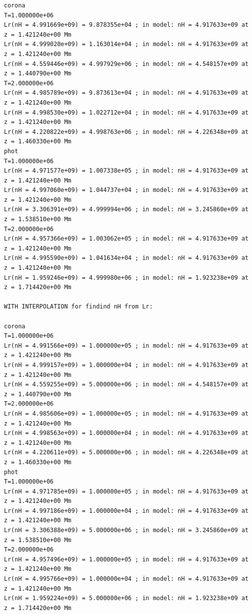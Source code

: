 \documentclass[10pt]{book}
\begin{document}
\begin{verbatim}
corona
T=1.000000e+06
Lr(nH = 4.991669e+09) = 9.878355e+04 ; in model: nH = 4.917633e+09 at z = 1.421240e+00 Mm
Lr(nH = 4.999020e+09) = 1.163014e+04 ; in model: nH = 4.917633e+09 at z = 1.421240e+00 Mm
Lr(nH = 4.559446e+09) = 4.997929e+06 ; in model: nH = 4.548157e+09 at z = 1.440790e+00 Mm
T=2.000000e+06
Lr(nH = 4.985789e+09) = 9.873613e+04 ; in model: nH = 4.917633e+09 at z = 1.421240e+00 Mm
Lr(nH = 4.998530e+09) = 1.022712e+04 ; in model: nH = 4.917633e+09 at z = 1.421240e+00 Mm
Lr(nH = 4.220822e+09) = 4.998763e+06 ; in model: nH = 4.226348e+09 at z = 1.460330e+00 Mm
phot
T=1.000000e+06
Lr(nH = 4.971577e+09) = 1.007338e+05 ; in model: nH = 4.917633e+09 at z = 1.421240e+00 Mm
Lr(nH = 4.997060e+09) = 1.044737e+04 ; in model: nH = 4.917633e+09 at z = 1.421240e+00 Mm
Lr(nH = 3.306391e+09) = 4.999994e+06 ; in model: nH = 3.245860e+09 at z = 1.538510e+00 Mm
T=2.000000e+06
Lr(nH = 4.957366e+09) = 1.003062e+05 ; in model: nH = 4.917633e+09 at z = 1.421240e+00 Mm
Lr(nH = 4.995590e+09) = 1.041634e+04 ; in model: nH = 4.917633e+09 at z = 1.421240e+00 Mm
Lr(nH = 1.959246e+09) = 4.999980e+06 ; in model: nH = 1.923238e+09 at z = 1.714420e+00 Mm

WITH INTERPOLATION for findind nH from Lr:

corona
T=1.000000e+06
Lr(nH = 4.991566e+09) = 1.000000e+05 ; in model: nH = 4.917633e+09 at z = 1.421240e+00 Mm
Lr(nH = 4.999157e+09) = 1.000000e+04 ; in model: nH = 4.917633e+09 at z = 1.421240e+00 Mm
Lr(nH = 4.559255e+09) = 5.000000e+06 ; in model: nH = 4.548157e+09 at z = 1.440790e+00 Mm
T=2.000000e+06
Lr(nH = 4.985606e+09) = 1.000000e+05 ; in model: nH = 4.917633e+09 at z = 1.421240e+00 Mm
Lr(nH = 4.998563e+09) = 1.000000e+04 ; in model: nH = 4.917633e+09 at z = 1.421240e+00 Mm
Lr(nH = 4.220611e+09) = 5.000000e+06 ; in model: nH = 4.226348e+09 at z = 1.460330e+00 Mm
phot
T=1.000000e+06
Lr(nH = 4.971785e+09) = 1.000000e+05 ; in model: nH = 4.917633e+09 at z = 1.421240e+00 Mm
Lr(nH = 4.997186e+09) = 1.000000e+04 ; in model: nH = 4.917633e+09 at z = 1.421240e+00 Mm
Lr(nH = 3.306388e+09) = 5.000000e+06 ; in model: nH = 3.245860e+09 at z = 1.538510e+00 Mm
T=2.000000e+06
Lr(nH = 4.957496e+09) = 1.000000e+05 ; in model: nH = 4.917633e+09 at z = 1.421240e+00 Mm
Lr(nH = 4.995766e+09) = 1.000000e+04 ; in model: nH = 4.917633e+09 at z = 1.421240e+00 Mm
Lr(nH = 1.959224e+09) = 5.000000e+06 ; in model: nH = 1.923238e+09 at z = 1.714420e+00 Mm




\end{verbatim}
\end{document}
